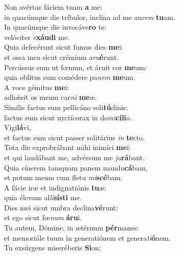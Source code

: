 \evenverse Non avértas fáciem tuam \textbf{a} me:~\*\\
\evenverse in quacúmque die tríbulor, inclína ad me au\textit{rem} \textbf{tu}am.\\
\oddverse In quacúmque die invocáve\textbf{ro} te:~\*\\
\oddverse velóciter \textit{e}\textbf{xáu}\textbf{di} me.\\
\evenverse Quia defecérunt sicut fumus dies \textbf{me}i:~\*\\
\evenverse et ossa mea sicut crémium a\textit{ru}\textbf{é}runt.\\
\oddverse Percússus sum ut fœnum, et áruit cor \textbf{me}um:~\*\\
\oddverse quia oblítus sum comédere pa\textit{nem} \textbf{me}um.\\
\evenverse A voce gémitus \textbf{me}i:~\*\\
\evenverse adhǽsit os meum car\textit{ni} \textbf{me}æ.\\
\oddverse Símilis factus sum pellicáno soli\textbf{tú}dinis:~\*\\
\oddverse factus sum sicut nyctícorax in do\textit{mi}\textbf{cí}\textbf{li}o.\\
\evenverse Vigi\textbf{lá}vi,~\*\\
\evenverse et factus sum sicut passer solitárius \textit{in} \textbf{te}cto.\\
\oddverse Tota die exprobrábant mihi inimíci \textbf{me}i:~\*\\
\oddverse et qui laudábant me, advérsum me \textit{ju}\textbf{rá}bant.\\
\evenverse Quia cínerem tamquam panem mandu\textbf{cá}bam,~\*\\
\evenverse et potum meum cum fletu \textit{mi}\textbf{scé}bam.\\
\oddverse A fácie iræ et indignatiónis \textbf{tu}æ:~\*\\
\oddverse quia élevans al\textit{li}\textbf{sí}\textbf{sti} me.\\
\evenverse Dies mei sicut umbra declina\textbf{vé}runt:~\*\\
\evenverse et ego sicut fœ\textit{num} \textbf{á}\textbf{ru}i.\\
\oddverse Tu autem, Dómine, in ætérnum \textbf{pér}manes:~\*\\
\oddverse et memoriále tuum in generatiónem et genera\textit{ti}\textbf{ó}nem.\\
\evenverse Tu exsúrgens miseréberis \textbf{Si}on:~\*\\
